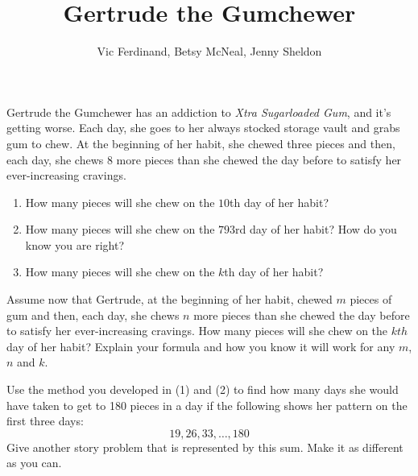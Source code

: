 \documentclass[nooutcomes]{ximera}
\title{Gertrude the Gumchewer}
\author{Vic Ferdinand, Betsy McNeal, Jenny Sheldon}
\begin{document}
\begin{abstract}
\end{abstract}
\maketitle



\begin{problem}
Gertrude the Gumchewer has an addiction to \textit{Xtra Sugarloaded
  Gum}, and it's getting worse.  Each day, she goes to her always
stocked storage vault and grabs gum to chew.  At the beginning of her
habit, she chewed three pieces and then, each day, she chews 8 more
pieces than she chewed the day before to satisfy her ever-increasing
cravings.
\begin{enumerate}
\item How many pieces will she chew on the $10$th day of her habit?
\item How many pieces will she chew on the $793$rd day of her habit? How do you know you are right?
\item How many pieces will she chew on the $k$th day of her habit?
\end{enumerate}
\end{problem}



\begin{problem}
Assume now that Gertrude, at the beginning of her habit, chewed $m$
pieces of gum and then, each day, she chews $n$ more pieces than she
chewed the day before to satisfy her ever-increasing cravings.  How many pieces will she chew on the $kth$
  day of her habit? Explain your formula and how you know it will work for any $m$, $n$ and $k$.  
\end{problem}

\begin{problem}
Use the method you developed in (1) and (2) to find how many days she would have taken to get to 180 pieces in a day if the following shows her pattern on the first three days:
\[
19, 26, 33, \dots , 180
\]
Give another story problem that is represented by this sum.  Make it as different as you can.
\end{problem}

\newpage
\end{document}
